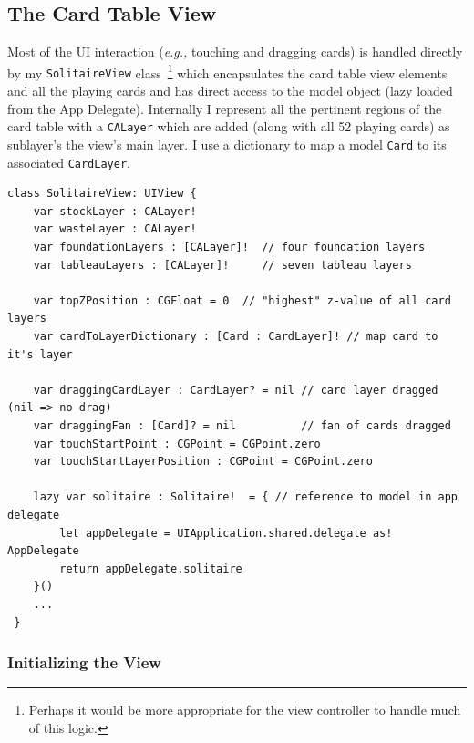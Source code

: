 \documentclass[11pt]{article}
\begin{document}
\subsection{The Card Table View}

Most of the UI interaction ({\it e.g.,} touching and dragging cards) 
is handled directly by my {\tt SolitaireView} class~\footnote{Perhaps it would
be more appropriate for the view controller to handle much of this logic.}
which encapsulates
the card table view elements and all the playing cards and has direct
access to the model object (lazy loaded from the App Delegate).
Internally I represent all the pertinent regions of the card
table with a {\tt CALayer} which are added (along with all 52 playing
cards) as sublayer's the view's main layer.
I use a dictionary to map a model {\tt Card} to its associated
{\tt CardLayer}. 
\begin{verbatim}
class SolitaireView: UIView {
    var stockLayer : CALayer!
    var wasteLayer : CALayer!
    var foundationLayers : [CALayer]!  // four foundation layers
    var tableauLayers : [CALayer]!     // seven tableau layers
    
    var topZPosition : CGFloat = 0  // "highest" z-value of all card layers
    var cardToLayerDictionary : [Card : CardLayer]! // map card to it's layer
    
    var draggingCardLayer : CardLayer? = nil // card layer dragged (nil => no drag)
    var draggingFan : [Card]? = nil          // fan of cards dragged
    var touchStartPoint : CGPoint = CGPoint.zero
    var touchStartLayerPosition : CGPoint = CGPoint.zero
    
    lazy var solitaire : Solitaire!  = { // reference to model in app delegate
        let appDelegate = UIApplication.shared.delegate as! AppDelegate
        return appDelegate.solitaire
    }()
    ...
 }
\end{verbatim}

\subsubsection{Initializing the View}
\end{document}
